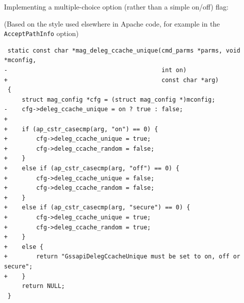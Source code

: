 \documentclass{article}
\begin{document}
Implementing a multiple-choice option (rather than a simple on/off) flag:

(Based on the style used elsewhere in Apache code, for example in the \texttt{AcceptPathInfo} option\cite{AcceptPathInfo-source})

\begin{verbatim}
 static const char *mag_deleg_ccache_unique(cmd_parms *parms, void *mconfig,
-                                           int on)
+                                           const char *arg)
 {
     struct mag_config *cfg = (struct mag_config *)mconfig;
-    cfg->deleg_ccache_unique = on ? true : false;
+
+    if (ap_cstr_casecmp(arg, "on") == 0) {
+        cfg->deleg_ccache_unique = true;
+        cfg->deleg_ccache_random = false;
+    }
+    else if (ap_cstr_casecmp(arg, "off") == 0) {
+        cfg->deleg_ccache_unique = false;
+        cfg->deleg_ccache_random = false;
+    }
+    else if (ap_cstr_casecmp(arg, "secure") == 0) {
+        cfg->deleg_ccache_unique = true;
+        cfg->deleg_ccache_random = true;
+    }
+    else {
+        return "GssapiDelegCcacheUnique must be set to on, off or secure";
+    }
     return NULL;
 }
\end{verbatim}
\end{document}
